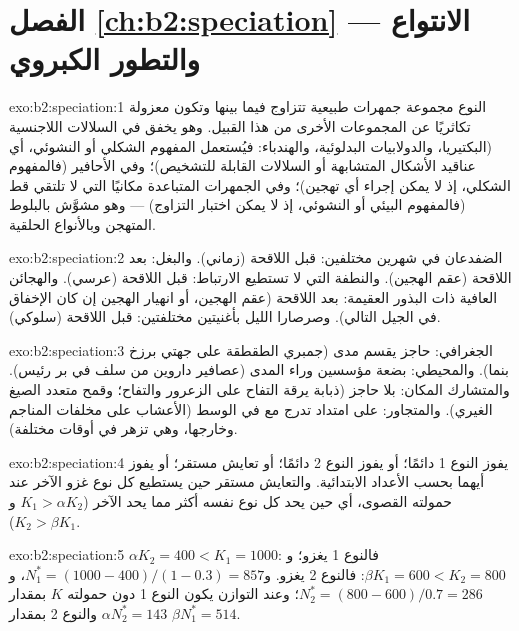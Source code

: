 \section*{الفصل \ref{ch:b2:speciation} --- الانتواع والتطور الكبروي}

\begin{solution}{exo:b2:speciation:1}
النوع مجموعة جمهرات طبيعية تتزاوج فيما بينها
وتكون معزولة تكاثريًا عن المجموعات الأخرى من هذا القبيل. وهو يخفق في
السلالات اللاجنسية (البكتيريا، والدولابيات البدلوئية، والهندباء:
فيُستعمل المفهوم الشكلي أو النشوئي، أي عناقيد الأشكال المتشابهة أو
السلالات القابلة للتشخيص)؛ وفي الأحافير (فالمفهوم الشكلي، إذ
لا يمكن إجراء أي تهجين)؛ وفي الجمهرات المتباعدة مكانيًا التي لا
تلتقي قط (فالمفهوم البيئي أو النشوئي، إذ لا يمكن اختبار
التزاوج) --- وهو مشوَّش بالبلوط المتهجن وبالأنواع
الحلقية.
\end{solution}

\begin{solution}{exo:b2:speciation:2}
الضفدعان في شهرين مختلفين: قبل اللاقحة (زماني). والبغل: بعد اللاقحة
(عقم الهجين). والنطفة التي لا تستطيع الارتباط: قبل اللاقحة (عرسي).
والهجائن العافية ذات البذور العقيمة: بعد اللاقحة (عقم الهجين،
أو انهيار الهجين إن كان الإخفاق في الجيل التالي).
وصرصارا الليل بأغنيتين مختلفتين: قبل اللاقحة (سلوكي).
\end{solution}

\begin{solution}{exo:b2:speciation:3}
الجغرافي: حاجز يقسم مدى (جمبري الطقطقة على جهتي
برزخ بنما). والمحيطي: بضعة مؤسسين وراء
المدى (عصافير داروين من سلف في بر رئيس). والمتشارك المكان:
بلا حاجز (ذبابة يرقة التفاح على الزعرور والتفاح؛ وقمح
متعدد الصيغ الغيري). والمتجاور: على امتداد تدرج مع  في الوسط (الأعشاب على مخلفات المناجم وخارجها، وهي تزهر في
أوقات مختلفة).
\end{solution}

\begin{solution}{exo:b2:speciation:4}
يفوز النوع 1 دائمًا؛ أو يفوز النوع 2 دائمًا؛ أو تعايش مستقر؛
أو يفوز أيهما بحسب الأعداد الابتدائية. والتعايش مستقر
حين يستطيع كل نوع غزو الآخر عند حمولته القصوى،
أي حين يحد كل نوع نفسه أكثر مما يحد
الآخر ($K_1 > \alpha K_2$ و$K_2 > \beta K_1$).
\end{solution}

\begin{solution}{exo:b2:speciation:5}
$\alpha K_2 = 400 < K_1 = 1000$: فالنوع 1 يغزو؛ و$\beta K_1 = 600
< K_2 = 800$: فالنوع 2 يغزو. و$N_1^{*} = (1000 - 400)/(1 - 0.3) =
857$، و$N_2^{*} = (800 - 600)/0.7 = 286$؛ وعند التوازن يكون النوع
1 دون حمولته $K$ بمقدار $\alpha N_2^{*} = 143$ والنوع 2 بمقدار $\beta
N_1^{*} = 514$.
\end{solution}


